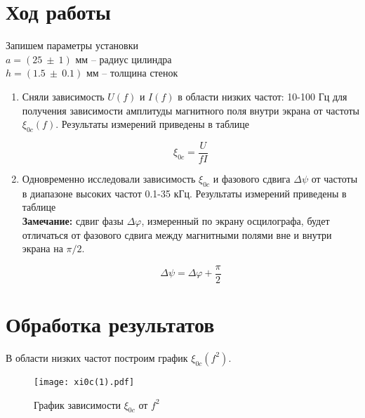 


    

    \section*{Ход работы}

    \begin{center}
        Запишем параметры установки \\
        $a = (25 ~ \pm ~ 1)$ мм -- радиус цилиндра \\
        $h = (1.5 ~ \pm ~ 0.1)$ мм -- толщина стенок
    \end{center}

    \begin{enumerate}
        \item Сняли зависимость $U(f)$ и $I(f)$ в области низких частот: 10-100 Гц для получения зависимости
        амплитуды магнитного поля внутри экрана от частоты $\xi_{0c}(f)$. Результаты измерений приведены в таблице %

        \begin{equation}
            \xi_{0c} = \frac{U}{f I}
        \end{equation}

        \item Одновременно исследовали зависимость $\xi_{0c}$ и фазового сдвига $\Delta \psi$ от частоты в диапазоне высоких частот
        0.1-35 кГц. Результаты измерений приведены в таблице %
        \\

        \textbf{Замечание:} сдвиг фазы $\Delta \varphi$, измеренный по экрану осцилографа, будет отличаться от
        фазового сдвига между магнитными полями вне и внутри экрана на $\pi/2$.

        \[ \Delta \psi = \Delta \varphi + \frac{\pi}{2} \]
    \end{enumerate}

    

    

    \section*{Обработка результатов}

    В области низких частот построим график $\xi_{0c}(f^2)$.

    \begin{figure}
        \centering
        \texttt{[image: xi0c(1).pdf]}
        \caption{График зависимости $\xi_{0c}$ от $f^2$}
        \label{xi0c(1)}
    \end{figure}

